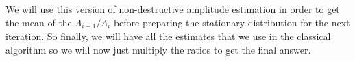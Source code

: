  We will use this version of non-destructive amplitude estimation in order to  get  the mean of the $\Lambda_{i+1}/\Lambda_{i} $ before preparing the stationary distribution for the next iteration.
 So finally, we will have all the estimates that we use in the classical algorithm so we will now just multiply the ratios to get the final answer.